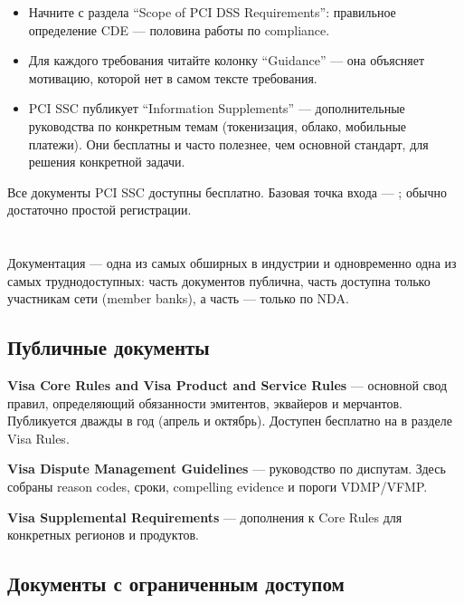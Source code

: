 \begin{itemize}
  \item Начните с раздела \enquote{Scope of PCI DSS
          Requirements}: правильное определение CDE — половина
        работы по compliance.
  \item Для каждого требования читайте колонку
        \enquote{Guidance} — она объясняет мотивацию,
        которой нет в самом тексте требования.
  \item PCI SSC публикует \enquote{Information Supplements} — дополнительные руководства по конкретным темам (токенизация,
        облако, мобильные платежи). Они бесплатны и часто полезнее, чем основной стандарт, для решения конкретной задачи.
\end{itemize}

Все документы PCI SSC доступны бесплатно. Базовая
точка входа — ;
обычно достаточно простой регистрации.

\section{}
\label{sec:ps-visa}

Документация  — одна из самых обширных
в индустрии и одновременно одна из самых труднодоступных:
часть документов публична, часть доступна только участникам
сети (member banks), а часть — только по NDA.

\subsection*{Публичные документы}

\textbf{Visa Core Rules and Visa Product and Service Rules} —
основной свод правил, определяющий обязанности эмитентов,
эквайеров и мерчантов. Публикуется дважды в год (апрель
и октябрь). Доступен бесплатно на 
в разделе Visa
Rules.

\textbf{Visa Dispute Management Guidelines} —
руководство по диспутам. Здесь собраны reason codes,
сроки, compelling evidence и пороги
VDMP/VFMP.

\textbf{Visa Supplemental Requirements} — дополнения
к Core Rules для конкретных регионов и продуктов.

\subsection*{Документы с ограниченным доступом}

